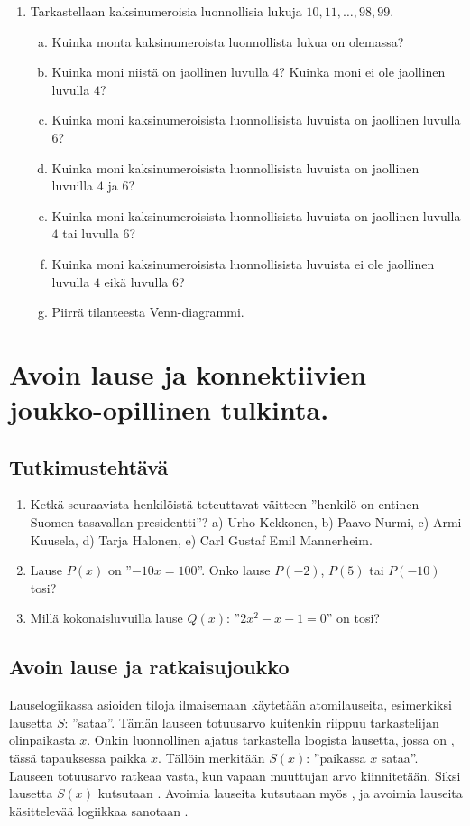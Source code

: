 \begin{enumerate}
\item Tarkastellaan kaksinumeroisia luonnollisia lukuja $10,11, \ldots ,98,99$.
\begin{enumerate}[a)]
\item Kuinka monta kaksinumeroista luonnollista lukua on olemassa?
\item Kuinka moni niistä on jaollinen luvulla $4$? Kuinka moni ei ole jaollinen luvulla $4$?
\item Kuinka moni kaksinumeroisista luonnollisista luvuista on jaollinen luvulla $6$?
\item Kuinka moni kaksinumeroisista luonnollisista luvuista on jaollinen luvuilla $4$ ja $6$?
\item Kuinka moni kaksinumeroisista luonnollisista luvuista on jaollinen luvulla $4$ tai luvulla $6$?
\item Kuinka moni kaksinumeroisista luonnollisista luvuista ei ole jaollinen luvulla $4$ eikä luvulla $6$?
\item Piirrä tilanteesta Venn-diagrammi.
\end{enumerate}

\end{enumerate}

\newpage


\section{Avoin lause ja konnektiivien joukko-opillinen tulkinta.}

\subsection*{Tutkimustehtävä}
\begin{enumerate}
\item Ketkä seuraavista henkilöistä toteuttavat väitteen ''henkilö on entinen Suomen tasavallan presidentti''? 
a) Urho Kekkonen,  b)  Paavo Nurmi,  c)  Armi Kuusela,  d)  Tarja Halonen,  
e) Carl Gustaf Emil Mannerheim.
\item
Lause $P(x)$ on ''$-10x = 100$''. Onko lause $P(-2)$, $P(5)$ tai $P(-10)$ tosi?
\item
Millä kokonaisluvuilla lause $Q(x)$: ''$2x^2 - x - 1 = 0$'' on tosi?
\end{enumerate}

\subsection*{Avoin lause ja ratkaisujoukko}
Lauselogiikassa asioiden tiloja ilmaisemaan käytetään atomilauseita, esimerkiksi lausetta $S$: ''sataa''. Tämän lauseen totuusarvo kuitenkin riippuu tarkastelijan olinpaikasta $x$. Onkin luonnollinen ajatus tarkastella loogista lausetta, jossa on , tässä tapauksessa paikka $x$. Tällöin merkitään $S(x)$: ''paikassa $x$ sataa''. Lauseen totuusarvo ratkeaa vasta, kun vapaan muuttujan arvo kiinnitetään. Siksi lausetta $S(x)$ kutsutaan . Avoimia lauseita kutsutaan myös , ja avoimia lauseita käsittelevää logiikkaa sanotaan .

